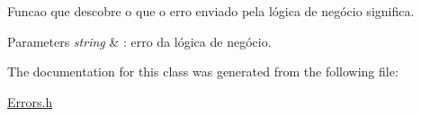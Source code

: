 Funcao que descobre o que o erro enviado pela lógica de negócio significa. 


\begin{DoxyParams}{Parameters}
{\em string} & \-: erro da lógica de negócio. \\
\hline
\end{DoxyParams}


The documentation for this class was generated from the following file\-:\begin{DoxyCompactItemize}
\item 
\hyperlink{_errors_8h}{Errors.\-h}\end{DoxyCompactItemize}
